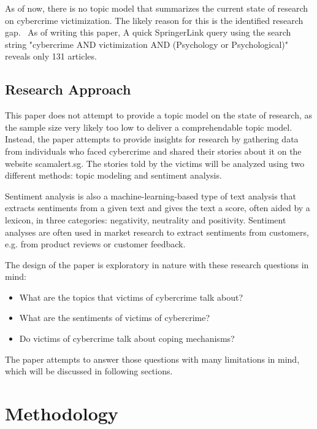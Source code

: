 \documentclass[12pt,english,titlepage,a4paper]{article}
\begin{document}
\bigskip

As of now, there is no topic model that summarizes the current state of research on cybercrime victimization. The likely reason for this is the identified research gap.~\citep{horesearch} As of writing this paper, A quick SpringerLink query using the search string "cybercrime AND victimization AND (Psychology or Psychological)" reveals only 131 articles.

\subsection{Research Approach}

This paper does not attempt to provide a topic model on the state of research, as the sample size very likely too low to deliver a comprehendable topic model. 
Instead, the paper attempts to provide insights for research by gathering data from individuals who faced cybercrime and shared their stories about it on the website scamalert.sg. The stories told by the victims will be analyzed using two different methods: topic modeling and sentiment analysis.

Sentiment analysis is also a machine-learning-based type of text analysis that extracts sentiments from a given text and gives the text a score, often aided by a lexicon, in three categories: negativity, neutrality and positivity. Sentiment analyses are often used in market research to extract sentiments from customers, e.g. from product reviews or customer feedback.~\cite{rambocas2013marketing}

\bigskip

The design of the paper is exploratory in nature with these research questions in mind:

\begin{itemize}
    \item What are the topics that victims of cybercrime talk about?
    \item What are the sentiments of victims of cybercrime?
    \item Do victims of cybercrime talk about coping mechanisms?
\end{itemize}


The paper attempts to answer those questions with many limitations in mind, which will be discussed in following sections.


\section{Methodology}
\end{document}
